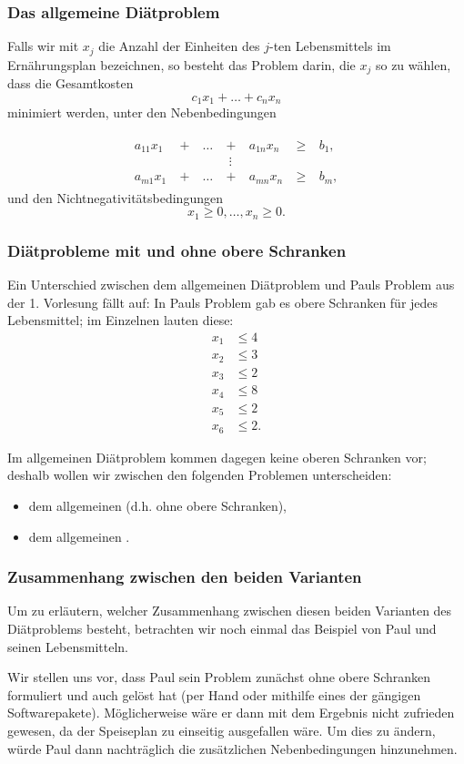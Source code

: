 \documentclass[smaller]{beamer}
\begin{document}
\begin{frame}
 \frametitle{Das allgemeine Diätproblem}
 Falls wir mit $x_j$ die Anzahl der Einheiten des $j$-ten Lebensmittels im Ernährungsplan bezeichnen, so besteht das Problem darin, die $x_j$ so zu wählen, dass die Gesamtkosten
\[
c_1x_1 + \ldots + c_nx_n 
\]
minimiert werden, unter den Nebenbedingungen

\begin{align*}
\begin{alignedat}{4}
a_{11}x_1 &\ + &\ \ldots &\ + &\ a_{1n}x_n &\ \geq &\ b_1, \\
 & & & \ \ \vdots & & & \\
a_{m1}x_1 &\ + &\ \ldots &\ + &\ a_{mn}x_n &\ \geq &\ b_m, 
\end{alignedat}
\end{align*}
und den Nichtnegativitätsbedingungen
\[
x_1 \geq 0, \ldots, x_n \geq 0.
\]
\end{frame}

\begin{frame}
 \frametitle{Diätprobleme mit und ohne obere Schranken}
 Ein Unterschied zwischen dem allgemeinen Diätproblem und Pauls Problem aus der 1. Vorlesung fällt auf: In Pauls Problem gab es obere Schranken für jedes Lebensmittel; im Einzelnen lauten diese:
\begin{align*}
x_1 &\leq 4 \\
x_2 &\leq 3 \\
x_3 &\leq 2 \\
x_4 &\leq 8 \\
x_5 &\leq 2 \\
x_6 &\leq 2.
\end{align*}

Im allgemeinen Diätproblem kommen dagegen keine oberen Schranken vor; deshalb wollen wir zwischen den folgenden Problemen unterscheiden:
\begin{itemize}
\item dem allgemeinen  (d.h. ohne obere Schranken),
\item dem allgemeinen .
\end{itemize}
 
\end{frame}

\begin{frame}
 \frametitle{Zusammenhang zwischen den beiden Varianten}
 Um zu erläutern, welcher Zusammenhang zwischen diesen beiden Varianten des Diätproblems besteht, betrachten wir noch einmal das Beispiel von Paul und seinen Lebensmitteln. \\ \vspace*{0.2cm}

Wir stellen uns vor, dass Paul sein Problem \alert{zunächst ohne obere Schranken} formuliert und auch gelöst hat (per Hand oder mithilfe eines der gängigen Softwarepakete). Möglicherweise wäre er dann mit dem Ergebnis nicht zufrieden gewesen, da der Speiseplan zu einseitig ausgefallen wäre. Um dies zu ändern, würde Paul dann \alert{nachträglich} die zusätzlichen Nebenbedingungen hinzunehmen.
\end{frame}
\end{document}
